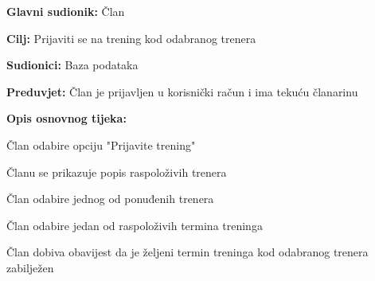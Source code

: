 			\noindent {}
			\begin{packed_item}
				
				\item \textbf{Glavni sudionik: } Član
				\item  \textbf{Cilj: } Prijaviti se na trening kod odabranog trenera
				\item  \textbf{Sudionici: } Baza podataka
				\item  \textbf{Preduvjet: } Član je prijavljen u korisnički račun i ima tekuću članarinu
				\item  \textbf{Opis osnovnog tijeka:}
				
				\item[] \begin{packed_enum}
					
					\item Član odabire opciju "Prijavite trening"
					\item Članu se prikazuje popis raspoloživih trenera
					\item Član odabire jednog od ponuđenih trenera
					\item Član odabire jedan od raspoloživih termina treninga
					\item Član dobiva obavijest da je željeni termin treninga kod odabranog trenera zabilježen
					
				\end{packed_enum}
			\end{packed_item}
		
